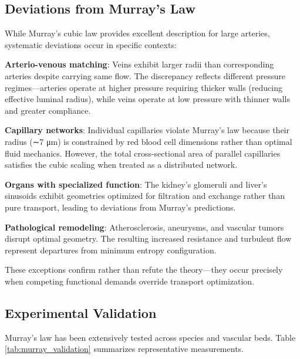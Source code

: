 \documentclass[10pt,twocolumn,a4paper]{article}
\theoremstyle{remark}
\begin{document}
\subsection{Deviations from Murray's Law}

While Murray's cubic law provides excellent description for large arteries, systematic deviations occur in specific contexts:

\textbf{Arterio-venous matching}: Veins exhibit larger radii than corresponding arteries despite carrying same flow. The discrepancy reflects different pressure regimes—arteries operate at higher pressure requiring thicker walls (reducing effective luminal radius), while veins operate at low pressure with thinner walls and greater compliance.

\textbf{Capillary networks}: Individual capillaries violate Murray's law because their radius (∼7 μm) is constrained by red blood cell dimensions rather than optimal fluid mechanics. However, the total cross-sectional area of parallel capillaries satisfies the cubic scaling when treated as a distributed network.

\textbf{Organs with specialized function}: The kidney's glomeruli and liver's sinusoids exhibit geometries optimized for filtration and exchange rather than pure transport, leading to deviations from Murray's predictions.

\textbf{Pathological remodeling}: Atherosclerosis, aneurysms, and vascular tumors disrupt optimal geometry. The resulting increased resistance and turbulent flow represent departures from minimum entropy configuration.

These exceptions confirm rather than refute the theory—they occur precisely when competing functional demands override transport optimization.

\subsection{Experimental Validation}

Murray's law has been extensively tested across species and vascular beds. Table \ref{tab:murray_validation} summarizes representative measurements.
\end{document}
